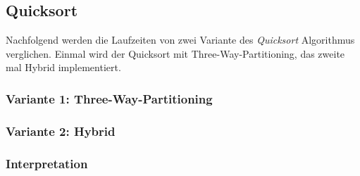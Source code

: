 \subsection{Quicksort}

Nachfolgend werden die Laufzeiten von zwei Variante des \textit{Quicksort} Algorithmus verglichen. Einmal wird der Quicksort mit Three-Way-Partitioning, das zweite mal Hybrid implementiert.

\subsubsection{Variante 1: Three-Way-Partitioning}
\subsubsection{Variante 2: Hybrid}
\subsubsection{Interpretation}
